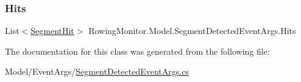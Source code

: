 \subsubsection{\texorpdfstring{Hits}{Hits}}
{\footnotesize\ttfamily List$<$\hyperlink{struct_rowing_monitor_1_1_model_1_1_util_1_1_segment_hit}{Segment\+Hit}$>$ Rowing\+Monitor.\+Model.\+Segment\+Detected\+Event\+Args.\+Hits\hspace{0.3cm}{\ttfamily [get]}}



The documentation for this class was generated from the following file\+:\begin{DoxyCompactItemize}
\item 
Model/\+Event\+Args/\hyperlink{_segment_detected_event_args_8cs}{Segment\+Detected\+Event\+Args.\+cs}\end{DoxyCompactItemize}
